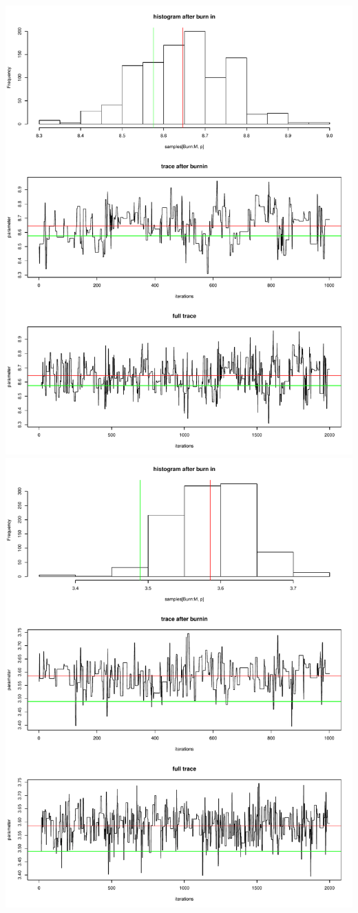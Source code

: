 \documentclass[a4paper,12pt]{scrartcl} %
\begin{document}
\includegraphics[scale=0.4]{7}
\includegraphics[scale=0.4]{8}
\end{document}
